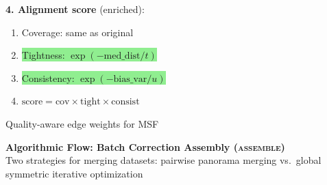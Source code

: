 \documentclass[8pt]{article}
\newlength{\colw}
\begin{document}
\begin{minipage}[t]{\colw}
\begin{keyboxG}
\textbf{4. Alignment score} (enriched):
\begin{enumerate}[leftmargin=1em, itemsep=0pt, topsep=1pt, parsep=0pt]
\item Coverage: same as original
\item \colorbox{lightgreen}{Tightness: $\exp(-\text{med\_dist}/t)$}
\item \colorbox{lightgreen}{Consistency: $\exp(-\text{bias\_var}/u)$}
\item $\text{score} = \text{cov} \times \text{tight} \times \text{consist}$
\end{enumerate}
{\scriptsize\color{added} Quality-aware edge weights for MSF}
\end{keyboxG}
\end{minipage}

\newpage
\setlength{\colw}{0.48\textwidth}

\begin{center}
{\large\bfseries Algorithmic Flow: Batch Correction Assembly (\textsc{assemble})}\\[1pt]
{\scriptsize Two strategies for merging datasets: pairwise panorama merging vs.\ global symmetric iterative optimization}
\end{center}
\vspace{2pt}
\end{document}
